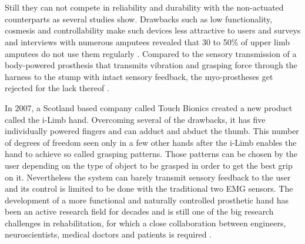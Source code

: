 \documentclass[main]{subfiles}
\begin{document}
\begin{figure}[htp]
\centering
{}\hspace{0.1\textwidth}
\\
\hspace{0.1\textwidth}
\\
\label{active-prostheses}
\end{figure}

Still they can not compete in reliability and durability with the non-actuated counterparts as several studies show. Drawbacks such as low functionality, cosmesis and controllability make such devices less attractive to users \cite{Carrozza2002} and surveys and interviews with numerous amputees revealed that 30 to 50\% of upper limb amputees do not use them regularly \cite{Atkins1996}. Compared to the sensory transmission of a body-powered prosthesis that transmits vibration and grasping force through the harness to the stump with intact sensory feedback, the myo-prostheses get rejected for the lack thereof \cite{Lundborg2001,Atkins1996}.

In 2007, a Scotland based company called Touch Bionics created a new product called the i-Limb hand. Overcoming several of the drawbacks, it has five individually powered fingers and can adduct and abduct the thumb. This number of degrees of freedom seen only in a few other hands after the i-Limb enables the hand to achieve so called grasping patterns. Those patterns can be chosen by the user depending on the type of object to be grasped in order to get the best grip on it. Nevertheless the system can barely transmit sensory feedback to the user and its control is limited to be done with the traditional two EMG sensors. The development of a more functional and naturally controlled prosthetic hand has been an active research field for decades and is still one of the big research challenges in rehabilitation, for which a close collaboration between engineers, neuroscientists, medical doctors and patients is required \cite{TheSmartHand2011}.
\end{document}
